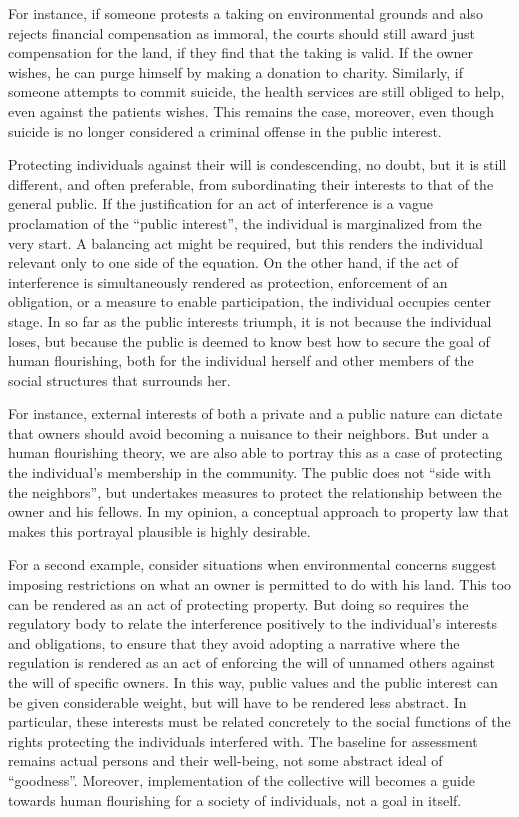 \documentclass[12pt,a4paper]{book} %
\begin{document}
For instance, if someone protests a taking on environmental grounds and also rejects financial compensation as immoral, the courts should still award just compensation for the land, if they find that the taking is valid. If the owner wishes, he can purge himself by making a donation to charity. Similarly, if someone attempts to commit suicide, the health services are still obliged to help, even against the patients wishes. This remains the case, moreover, even though suicide is no longer considered a criminal offense in the public interest. 

Protecting individuals against their will is condescending, no doubt, but it is still different, and often preferable, from subordinating their interests to that of the general public. If the justification for an act of interference is a vague proclamation of the ``public interest'', the individual is marginalized from the very start. A balancing act might be required, but this renders the individual relevant only to one side of the equation. On the other hand, if the act of interference is simultaneously rendered as protection, enforcement of an obligation, or a measure to enable participation, the individual occupies center stage. In so far as the public interests triumph, it is not because the individual loses, but because the public is deemed to know best how to secure the goal of human flourishing, both for the individual herself and other members of the social structures that surrounds her.

For instance, external interests of both a private and a public nature can dictate that owners should avoid becoming a nuisance to their neighbors. But under a human flourishing theory, we are also able to portray this as a case of protecting the individual's membership in the community. The public does not ``side with the neighbors'', but undertakes measures to protect the relationship between the owner and his fellows. In my opinion, a conceptual approach to property law that makes this portrayal plausible is highly desirable. 

For a second example, consider situations when environmental concerns suggest imposing restrictions on what an owner is permitted to do with his land. This too can be rendered as an act of protecting property. But doing so requires the regulatory body to relate the interference positively to the individual's interests and obligations, to ensure that they avoid adopting a narrative where the regulation is rendered as an act of enforcing the will of unnamed others against the will of specific owners. In this way, public values and the public interest can be given considerable weight, but will have to be rendered less abstract. In particular, these interests must be related concretely to the social functions of the rights protecting the individuals interfered with. The baseline for assessment remains actual persons and their well-being, not some abstract ideal of ``goodness''. Moreover, implementation of the collective will becomes a guide towards human flourishing for a society of individuals, not a goal in itself.
\end{document}
